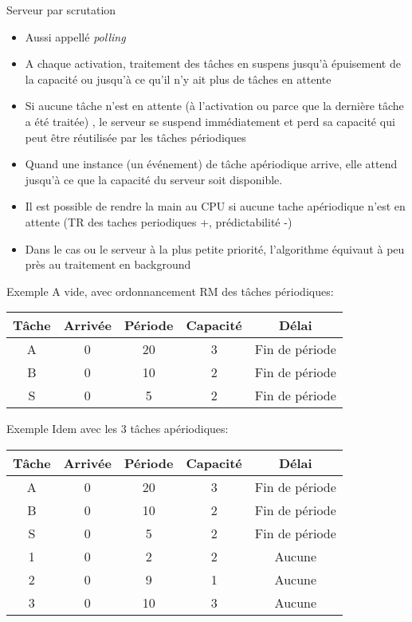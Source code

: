 \begin{frame}{Serveur par scrutation}
  \begin{itemize}
  \item Aussi appellé \emph{polling}
  \item A chaque activation,  traitement des tâches en suspens jusqu'à
    épuisement  de la capacité  ou jusqu'à  ce qu'il  n'y ait  plus de
    tâches en attente
  \item Si aucune tâche n'est  en attente (à l'activation ou parce que
    la  dernière  tâche  a  été  traitée)  ,  le  serveur  se  suspend
    immédiatement et perd sa capacité qui peut être réutilisée par les
    tâches périodiques
  \item Quand une instance (un événement) de tâche apériodique arrive,
    elle attend jusqu’à ce que la capacité du serveur soit disponible.
  \item  Il est  possible de  rendre la  main au  CPU si  aucune tache
    apériodique  n'est  en  attente  (TR  des  taches  periodiques  +,
    prédictabilité -)
  \item  Dans  le  cas  ou  le  serveur à  la  plus  petite  priorité,
    l'algorithme équivaut à peu près au traitement en background
  \end{itemize}
\end{frame} 

\begin{frame}{Exemple}
  A vide, avec ordonnancement RM des tâches périodiques:
  \begin{center}
    \begin{tabular}{ccccc}
      \hline
      Tâche & Arrivée & Période & Capacité & Délai \\
      \hline
      A & 0 & 20 & 3 & Fin de période\\
      B & 0 & 10 & 2 & Fin de période\\
      S & 0 &  5 & 2 & Fin de période\\
      \hline
    \end{tabular}
    \pause
    
  \end{center} 
\end{frame} 

\begin{frame}{Exemple}
  Idem avec les 3 tâches apériodiques:
  \begin{center}
    \begin{tabular}{ccccc}
      \hline
      Tâche & Arrivée & Période & Capacité & Délai \\
      \hline
      A & 0 & 20 & 3 & Fin de période\\
      B & 0 & 10 & 2 & Fin de période\\
      S & 0 &  5 & 2 & Fin de période\\
      1 & 0 &  2 & 2 & Aucune\\
      2 & 0 &  9 & 1 & Aucune\\
      3 & 0 & 10 & 3 & Aucune\\
      \hline
    \end{tabular}
    \pause
    
  \end{center}
\end{frame} 

